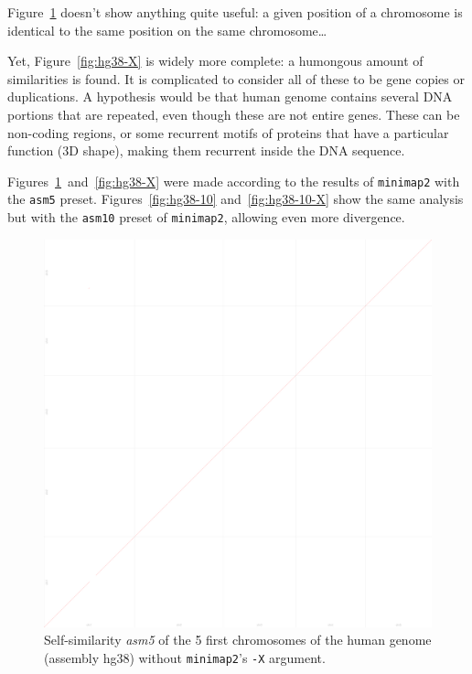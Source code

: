 \documentclass{article}
\begin{document}
Figure~\ref{fig:hg38} doesn't show anything quite useful: a given position of a chromosome is identical to the same position on the same chromosome\ldots

Yet, Figure~\ref{fig:hg38-X} is widely more complete: a humongous amount of similarities is found. It is complicated to consider all of these
to be gene copies or duplications. A hypothesis would be that human genome contains several DNA portions that are repeated, even though
these are not entire genes. These can be non-coding regions, or some recurrent motifs of proteins that have a particular function (3D shape),
making them recurrent inside the DNA sequence.

Figures~\ref{fig:hg38}~and~\ref{fig:hg38-X} were made according to the results of \texttt{minimap2} with the \texttt{asm5} preset. Figures~\ref{fig:hg38-10}
and~\ref{fig:hg38-10-X} show the same analysis but with the \texttt{asm10} preset of \texttt{minimap2}, allowing even more divergence.

\begin{figure}[!h]
	\hspace{-1cm}
	\includegraphics[width=1.1\textwidth]{figs/human.eps}
	\caption{Self-similarity \textit{asm5} of the 5 first chromosomes of the human genome (assembly hg38) without \texttt{minimap2}'s \texttt{-X} argument.
	\label{fig:hg38}}
\end{figure}
\end{document}
